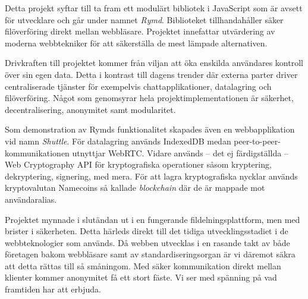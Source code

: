 Detta projekt syftar till ta fram ett modulärt bibliotek i JavaScript som är avsett för utvecklare och går under namnet \emph{Rymd}. Biblioteket tillhandahåller säker filöverföring direkt mellan webbläsare. Projektet innefattar utvärdering av moderna webbtekniker för att säkerställa de mest lämpade alternativen.

Drivkraften till projektet kommer från viljan att öka enskilda användares kontroll över sin egen data. Detta i kontrast till dagens trender där externa parter driver centraliserade tjänster för exempelvis chattapplikationer, datalagring och filöverföring. Något som genomsyrar hela projektimplementationen är säkerhet, decentralisering, anonymitet samt modularitet. 

Som demonstration av Rymds funktionalitet skapades även en webbapplikation vid namn \emph{Shuttle}. För datalagring används IndexedDB medan peer-to-peer-kommunikationen utnyttjar WebRTC. Vidare används – det ej färdigställda – Web Cryptography API för kryptografiska operationer såsom kryptering, dekryptering, signering, med mera. För att lagra kryptografiska nycklar används kryptovalutan Namecoins så kallade \emph{blockchain} där de är mappade mot användaralias.

Projektet mynnade i slutändan ut i en fungerande fildelningsplattform, men med brister i säkerheten. Detta härleds direkt till det tidiga utvecklingsstadiet i de webbteknologier som används. Då webben utvecklas i en rasande takt av både företagen bakom webbläsare samt av standardiseringsorgan är vi däremot säkra att detta rättas till så småningom. Med säker kommunikation direkt mellan klienter kommer anonymitet få ett stort fäste. Vi ser med spänning på vad framtiden har att erbjuda.

